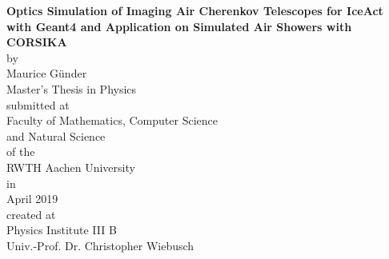\begin{titlepage}
\addtolength{\oddsidemargin}{4mm}
\begin{center}

\Large
\textbf{Optics Simulation of Imaging Air Cherenkov Telescopes for IceAct with Geant4 and Application on Simulated Air Showers with CORSIKA} \\[15mm]

{\large by}\\[1mm]
\Large
Maurice Günder\\[18mm]

Master's Thesis in Physics\\[18mm]

{\large submitted at}\\[1mm]
Faculty of Mathematics, Computer Science\\and Natural Science\\ 
of the\\RWTH Aachen University\\[15mm]

{\large in}\\[1mm]
April 2019\\[18mm]

{\large created at}\\[1mm]
Physics Institute III B \\ Univ.-Prof. Dr. Christopher Wiebusch\\[18mm]

\end{center}
\end{titlepage}